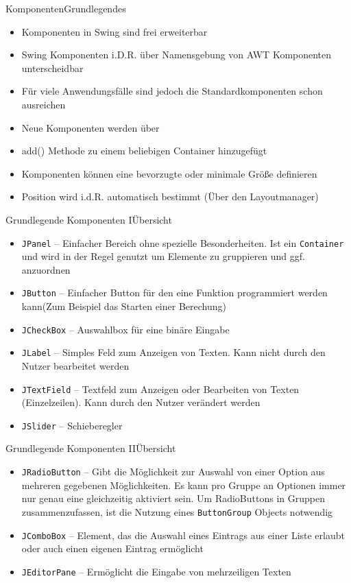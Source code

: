 \begin{frame}{Komponenten}{Grundlegendes}
    \begin{itemize}
        \item Komponenten in Swing sind frei erweiterbar
        \item Swing Komponenten i.D.R. über Namensgebung von AWT Komponenten unterscheidbar
        \item Für viele Anwendungsfälle sind jedoch die Standardkomponenten schon ausreichen
        \item Neue Komponenten werden über \item{add()} Methode zu einem beliebigen Container hinzugefügt
        \item Komponenten können eine bevorzugte oder minimale Größe definieren
        \item Position wird i.d.R. automatisch bestimmt (Über den Layoutmanager)
    \end{itemize}
\end{frame}

\begin{frame}{Grundlegende Komponenten I}{Übersicht}
    \begin{itemize}[<+->]
        \item \texttt{JPanel} -- Einfacher Bereich ohne spezielle Besonderheiten. Ist ein \texttt{Container} und wird in der Regel genutzt um Elemente zu gruppieren und ggf. anzuordnen
        \item \texttt{JButton} -- Einfacher Button für den eine Funktion programmiert werden kann(Zum Beispiel das Starten einer Berechung)
        \item \texttt{JCheckBox} -- Auswahlbox für eine binäre Eingabe
        \item \texttt{JLabel} -- Simples Feld zum Anzeigen von Texten. Kann nicht durch den Nutzer bearbeitet werden
        \item \texttt{JTextField} -- Textfeld zum Anzeigen oder Bearbeiten von Texten (Einzelzeilen). Kann durch den Nutzer verändert werden
        \item \texttt{JSlider} -- Schieberegler
    \end{itemize}
\end{frame}

\begin{frame}{Grundlegende Komponenten II}{Übersicht}
	\begin{itemize}[<+->]
		\item \texttt{JRadioButton} -- Gibt die Möglichkeit zur Auswahl von einer Option aus mehreren gegebenen Möglichkeiten. Es kann pro Gruppe an Optionen immer nur genau eine gleichzeitig aktiviert sein. Um RadioButtons in Gruppen zusammenzufassen, ist die Nutzung eines \texttt{ButtonGroup} Objects notwendig
        \item \texttt{JComboBox} -- Element, das die Auswahl eines Eintrags aus einer Liste erlaubt oder auch einen eigenen Eintrag ermöglicht
        \item \texttt{JEditorPane} -- Ermöglicht die Eingabe von mehrzeiligen Texten
	\end{itemize}
\end{frame}